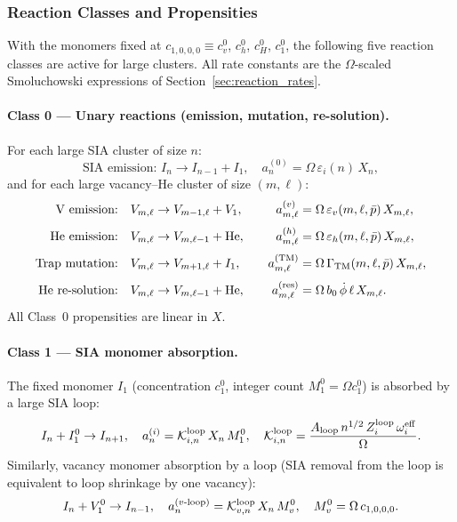 \documentclass[pdflatex,sn-basic]{sn-jnl} %
\begin{document}
\subsubsection{Reaction Classes and Propensities}
\label{sec:hybrid_propensities}

With the monomers fixed at $c_{1,0,0,0} \equiv c_v^0$,
$c_h^0$, $c_H^0$, $c_1^0$, the following five reaction classes
are active for large clusters.  All rate constants are the
$\Omega$-scaled Smoluchowski expressions of
Section~\ref{sec:reaction_rates}.

\paragraph{Class 0 --- Unary reactions (emission, mutation,
re-solution).}
For each large SIA cluster of size $n$:
\begin{equation}\label{eq:r0_SIA}
    \text{SIA emission: } I_n \to I_{n-1} + I_1,
    \quad
    a_n^{(0)} = \Omega\,\varepsilon_i(n)\,X_n,
\end{equation}
and for each large vacancy--He cluster of size $(m,\ell)$:
\begin{alignat}{2}
    \text{V emission:} \quad &
    V_{m,\ell} \to V_{m-1,\ell} + V_1,
    \quad &
    a_{m,\ell}^{(v)} &=
    \Omega\,\varepsilon_v(m,\ell,\bar{p})\,X_{m,\ell},
    \label{eq:r0_v}\\[3pt]
    \text{He emission:} \quad &
    V_{m,\ell} \to V_{m,\ell-1} + \mathrm{He},
    \quad &
    a_{m,\ell}^{(h)} &=
    \Omega\,\varepsilon_h(m,\ell,\bar{p})\,X_{m,\ell},
    \label{eq:r0_h}\\[3pt]
    \text{Trap mutation:} \quad &
    V_{m,\ell} \to V_{m+1,\ell} + I_1,
    \quad &
    a_{m,\ell}^{(\rm TM)} &=
    \Omega\,\Gamma_{\rm TM}(m,\ell,\bar{p})\,X_{m,\ell},
    \label{eq:r0_TM}\\[3pt]
    \text{He re-solution:} \quad &
    V_{m,\ell} \to V_{m,\ell-1} + \mathrm{He},
    \quad &
    a_{m,\ell}^{(\rm res)} &=
    \Omega\,b_0\,\dot{\phi}\,\ell\,X_{m,\ell}.
    \label{eq:r0_res}
\end{alignat}
All Class~0 propensities are linear in $X$.

\paragraph{Class 1 --- SIA monomer absorption.}
The fixed monomer $I_1$ (concentration $c_1^0$, integer count
$M_1^0 = \Omega c_1^0$) is absorbed by a large SIA loop:
\begin{equation}\label{eq:r1_SIA}
    I_n + I_1^0 \to I_{n+1},
    \quad
    a_n^{(i)} = \mathcal{K}_{i,n}^{\rm loop}\,X_n\,M_1^0,
    \quad
    \mathcal{K}_{i,n}^{\rm loop}
    = \frac{A_{\rm loop}\,n^{1/2}\,Z_i^{\rm loop}\,\omega_i^{\rm eff}}{\Omega}.
\end{equation}
Similarly, vacancy monomer absorption by a loop (SIA removal from
the loop is equivalent to loop shrinkage by one vacancy):
\begin{equation}\label{eq:r1_SIAv}
    I_n + V_1^0 \to I_{n-1},
    \quad
    a_n^{(v\text{-loop})}
    = \mathcal{K}_{v,n}^{\rm loop}\,X_n\,M_v^0,
    \quad
    M_v^0 = \Omega\,c_{1,0,0,0}.
\end{equation}
\end{document}
